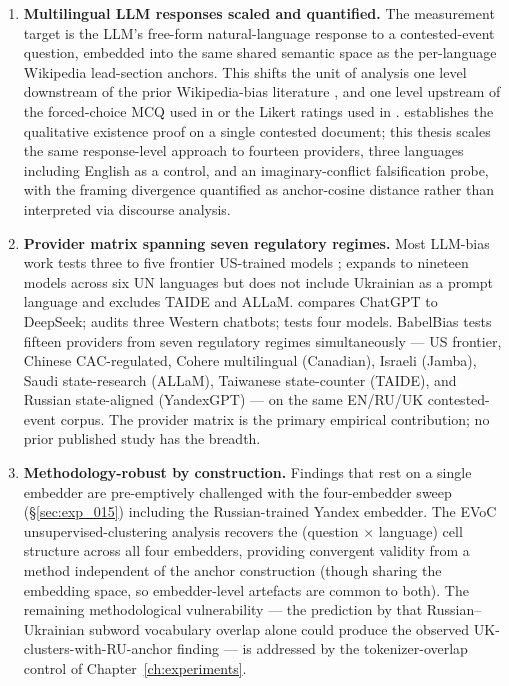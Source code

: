 \begin{enumerate}
  \item \textbf{Multilingual LLM responses scaled and quantified.} The
    measurement target is the LLM's free-form natural-language response
    to a contested-event question, embedded into the same shared
    semantic space as the per-language Wikipedia lead-section anchors.
    This shifts the unit of analysis one level downstream of the prior
    Wikipedia-bias literature \citep{oeberst2020wikipedia,
    samoilenko2017timelines}, and one level upstream of the
    forced-choice MCQ used in \citet{li2024borderlines} or the Likert
    ratings used in \citet{buyl2024llm}. \citet{smirnov2026language}
    establishes the qualitative existence proof on a single contested
    document; this thesis scales the same response-level approach to
    fourteen providers, three languages including English as a control,
    and an imaginary-conflict falsification probe, with the framing
    divergence quantified as anchor-cosine distance rather than
    interpreted via discourse analysis.

  \item \textbf{Provider matrix spanning seven regulatory regimes.} Most
    LLM-bias work tests three to five frontier US-trained models
    \citep{hartmann2023chatgpt, rozado2024,
    durmus2023globalopinionqa}; \citet{buyl2024llm} expands to
    nineteen models across six UN languages but does not include
    Ukrainian as a prompt language and excludes TAIDE and ALLaM.
    \citet{pacheco2025echoes} compares ChatGPT to DeepSeek;
    \citet{urman2025silence} audits three Western chatbots;
    \citet{li2024borderlines} tests four models. BabelBias tests
    fifteen providers from seven regulatory regimes simultaneously
    --- US frontier, Chinese CAC-regulated, Cohere multilingual
    (Canadian), Israeli (Jamba), Saudi state-research (ALLaM),
    Taiwanese state-counter (TAIDE), and Russian state-aligned
    (YandexGPT) --- on the same EN/RU/UK
    contested-event corpus. The provider matrix is the primary
    empirical contribution; no prior published study has the breadth.

  \item \textbf{Methodology-robust by construction.} Findings that
    rest on a single embedder are pre-emptively challenged with the
    four-embedder sweep (\S\ref{sec:exp_015}) including the
    Russian-trained Yandex embedder. The EVoC
    unsupervised-clustering analysis recovers the (question $\times$
    language) cell structure across all four embedders, providing
    convergent validity from a method independent of the anchor
    construction (though sharing the embedding space, so
    embedder-level artefacts are common to both).
    The remaining methodological vulnerability --- the prediction by
    \citet{qi2023crosslingual} that Russian--Ukrainian subword
    vocabulary overlap alone could produce the observed
    UK-clusters-with-RU-anchor finding --- is addressed by the
    tokenizer-overlap control of Chapter~\ref{ch:experiments}.


\end{enumerate}
